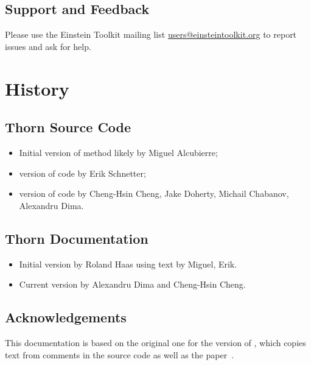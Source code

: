 \subsection{Support and Feedback}
Please use the Einstein Toolkit mailing list
\url{users@einsteintoolkit.org} to report issues and ask for help.

\section{History}

\subsection{Thorn Source Code}
\begin{itemize}
\item Initial version of method likely by Miguel Alcubierre;
\item {} version of code by Erik Schnetter;
\item {} version of code by Cheng-Hsin Cheng, Jake Doherty,
  Michail Chabanov, Alexandru Dima.
\end{itemize}

\subsection{Thorn Documentation}
\begin{itemize}
\item Initial version by Roland Haas using text by Miguel, Erik.
\item Current version by Alexandru Dima and Cheng-Hsin Cheng.
\end{itemize}

\subsection{Acknowledgements}
This documentation is based on the original one for the  version
of , which copies text from comments in the source code as well
as the paper~\cite{SpacetimeX_NewRadX_Alcubierre:2002kk}.

